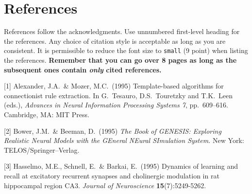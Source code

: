 \documentclass{article}
\begin{document}
\section*{References}

References follow the acknowledgments. Use unnumbered first-level
heading for the references. Any choice of citation style is acceptable
as long as you are consistent. It is permissible to reduce the font
size to \verb+small+ (9 point) when listing the references. {\bf
  Remember that you can go over 8 pages as long as the subsequent ones contain
  \emph{only} cited references.}
\medskip

\small

[1] Alexander, J.A.\ \& Mozer, M.C.\ (1995) Template-based algorithms
for connectionist rule extraction. In G.\ Tesauro, D.S.\ Touretzky and
T.K.\ Leen (eds.), {\it Advances in Neural Information Processing
  Systems 7}, pp.\ 609--616. Cambridge, MA: MIT Press.

[2] Bower, J.M.\ \& Beeman, D.\ (1995) {\it The Book of GENESIS:
  Exploring Realistic Neural Models with the GEneral NEural SImulation
  System.}  New York: TELOS/Springer--Verlag.

[3] Hasselmo, M.E., Schnell, E.\ \& Barkai, E.\ (1995) Dynamics of
learning and recall at excitatory recurrent synapses and cholinergic
modulation in rat hippocampal region CA3. {\it Journal of
  Neuroscience} {\bf 15}(7):5249-5262.
\end{document}
